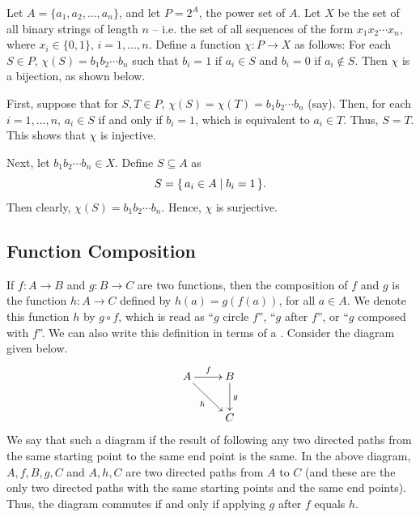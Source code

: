 \begin{Example}
Let $A = \{a_1, a_2, \ldots, a_n\}$, and let $P = 2^A$, the power set of $A$. Let $X$ be the set of all binary strings of length $n$ -- i.e. the set of all sequences of the form $x_1 x_2 \cdots x_n$, where $x_i \in \{0, 1\}$, $i = 1, \ldots, n$. Define a function $\chi \colon P \to X$ as follows: For each $S \in P$, $\chi(S) = b_1 b_2 \cdots b_n$ such that $b_i = 1$ if $a_i \in S$ and $b_i = 0$ if $a_i \notin S$. Then $\chi$ is a bijection, as shown below.

First, suppose that for $S, T \in P$, $\chi(S) = \chi(T) = b_1 b_2 \cdots b_n$ (say). Then, for each $i = 1, \ldots, n$, $a_i \in S$ if and only if $b_i = 1$, which is equivalent to $a_i \in T$. Thus, $S = T$. This shows that $\chi$ is injective.

Next, let $b_1 b_2 \cdots b_n \in X$. Define $S \subseteq A$ as
\begin{equation*}
S = \qty{\, a_i \in A \mid b_i = 1 \,}.
\end{equation*}
Then clearly, $\chi(S) = b_1 b_2 \cdots b_n$. Hence, $\chi$ is surjective.
\end{Example}

\subsection{Function Composition}\label{subsec:FuncComp}

If $f \colon A \to B$ and $g \colon B \to C$ are two functions, then the composition of $f$ and $g$ is the function $h \colon A \to C$ defined by $h(a) = g(f(a))$, for all $a \in A$. We denote this function $h$ by $g \circ f$, which is read as ``$g$ circle $f$'', ``$g$ after $f$'', or ``$g$ composed with $f$''. We can also write this definition in terms of a . Consider the diagram given below.
\begin{equation*}
\xymatrix{
    A \ar[r]^f \ar[rd]_h & B \ar[d]^g \\
    & C
}
\end{equation*}
We say that such a diagram  if the result of following any two directed paths from the same starting point to the same end point is the same. In the above diagram, $A, f, B, g, C$ and $A, h, C$ are two directed paths from $A$ to $C$ (and these are the only two directed paths with the same starting points and the same end points). Thus, the diagram commutes if and only if applying $g$ after $f$ equals $h$.

